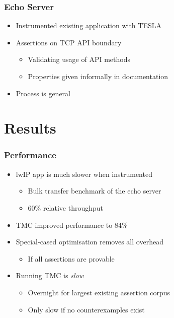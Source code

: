 \documentclass{beamer}
\begin{document}
\begin{frame}
  \frametitle{Echo Server}

  \begin{itemize}
    \item Instrumented existing application with TESLA
    \item Assertions on TCP API boundary
      \begin{itemize}
        \item Validating usage of API methods
        \item Properties given informally in documentation
      \end{itemize}
    \item Process is general
  \end{itemize}
\end{frame}

\section{Results}

\begin{frame}
  \frametitle{Performance}

  \begin{itemize}
    \item lwIP app is much slower when instrumented
      \begin{itemize}
        \item Bulk transfer benchmark of the echo server
        \item 60\% relative throughput
      \end{itemize}
    \item TMC improved performance to 84\%
    \item Special-cased optimisation removes all overhead
      \begin{itemize}
        \item If all assertions are provable
      \end{itemize}
    \item Running TMC is \emph{slow}
      \begin{itemize}
        \item Overnight for largest existing assertion corpus
        \item Only slow if no counterexamples exist
      \end{itemize}
  \end{itemize}
\end{frame}
\end{document}

